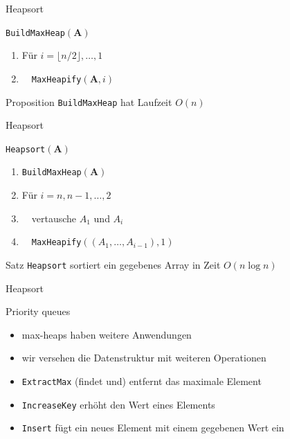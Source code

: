 \documentclass[aspectratio=1610, 11pt]{beamer}
\renewcommand{\vec}[1]{\boldsymbol{#1}}
\newcommand\vA{\vec A}
\begin{document}
\begin{frame}{Heapsort}
	\begin{exampleblock}{{\tt BuildMaxHeap}$(\vA)$}
		\begin{enumerate}
			\item F\"ur $i=\lfloor n/2\rfloor,\ldots,1$
			\item $\quad${\tt MaxHeapify}$(\vA,i)$
		\end{enumerate}
	\end{exampleblock}
	\begin{block}{Proposition}
		{\tt BuildMaxHeap} hat Laufzeit $O(n)$
	\end{block}
\end{frame}

\begin{frame}{Heapsort}
	\begin{exampleblock}{{\tt Heapsort}$(\vA)$}
		\begin{enumerate}
			\item {\tt BuildMaxHeap}$(\vA)$
			\item F\"ur $i=n,n-1,\ldots,2$
			\item $\quad$vertausche $A_1$ und $A_i$
			\item $\quad${\tt MaxHeapify}$((A_1,\ldots,A_{i-1}),1)$
		\end{enumerate}
	\end{exampleblock}
	\begin{block}{Satz}
		{\tt Heapsort} sortiert ein gegebenes Array in Zeit $O(n\log n)$
	\end{block}
\end{frame}

\begin{frame}{Heapsort}
	\begin{exampleblock}{Priority queues}
		\begin{itemize}
			\item max-heaps haben weitere Anwendungen
			\item wir versehen die Datenstruktur mit weiteren Operationen
			\item {\tt ExtractMax} (findet und) entfernt das maximale Element
			\item {\tt IncreaseKey} erh\"oht den Wert eines Elements
			\item {\tt Insert} f\"ugt ein neues Element mit einem gegebenen Wert ein
		\end{itemize}
	\end{exampleblock}
\end{frame}
\end{document}
